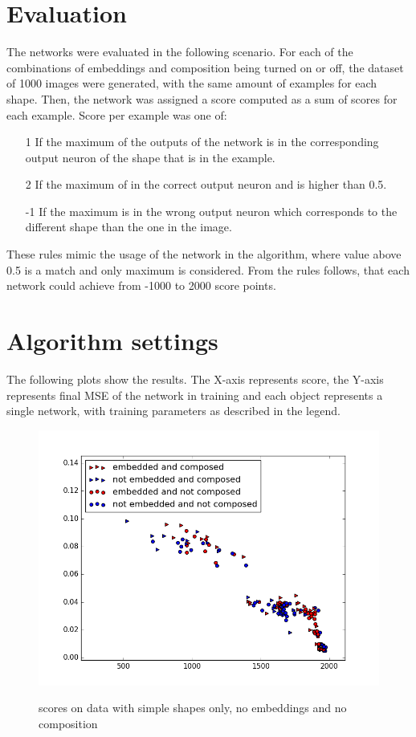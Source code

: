 \begin{description}
\section{Evaluation}
The networks were evaluated in the following scenario. For each of the combinations of embeddings and composition being turned on or off, the dataset of 1000 images were generated, with the same amount of examples for each shape. Then, the network was assigned a score computed as a sum of scores for each example. Score per example was one of:

\begin{enumerate}
\item [1] If the maximum of the outputs of the network is in the corresponding output neuron of the shape that is in the example.
\item [2] If the maximum of in the correct output neuron and is higher than 0.5.
\item [-1] If the maximum is in the wrong output neuron which corresponds to the different shape than the one in the image.
\end{enumerate}

These rules mimic the usage of the network in the algorithm, where value above 0.5 is a match and only maximum is considered. From the rules follows, that each network could achieve from -1000 to 2000 score points. 

\section{Algorithm settings}
The following plots show the results. The X-axis represents score, the Y-axis represents final MSE of the network in training and each object represents a single network, with training parameters as described in the legend.

\begin{figure}[!htb]
\begin{center}
\label{fig:simples_com}
\includegraphics[width=\linewidth]{ext/figure_simples_com.png}
\end{center}
    \centering
    \caption{scores on data with simple shapes only, no embeddings and no composition}
\end{figure}


\end{description}
